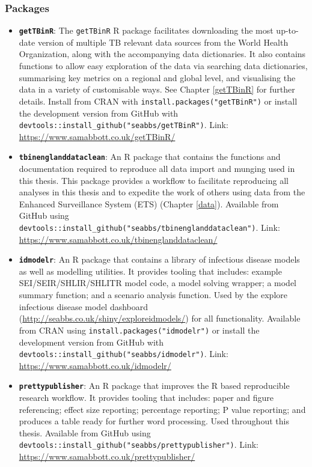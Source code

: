 \documentclass[11pt,twoside]{bristolthesis}
\begin{document}
  \hypertarget{packages}{%
  \subsubsection{Packages}\label{packages}}
  \begin{itemize}
  \item
    \textbf{\texttt{getTBinR}}: The \texttt{getTBinR} R package facilitates downloading the most up-to-date version of multiple TB relevant data sources from the World Health Organization, along with the accompanying data dictionaries. It also contains functions to allow easy exploration of the data via searching data dictionaries, summarising key metrics on a regional and global level, and visualising the data in a variety of customisable ways. See Chapter \ref{getTBinR} for further details. Install from CRAN with \texttt{install.packages("getTBinR")} or install the development version from GitHub with \texttt{devtools::install\_github("seabbs/getTBinR")}. Link: \url{https://www.samabbott.co.uk/getTBinR/}
  \item
    \textbf{\texttt{tbinenglanddataclean}}: An R package that contains the functions and documentation required to reproduce all data import and munging used in this thesis. This package provides a workflow to facilitate reproducing all analyses in this thesis and to expedite the work of others using data from the Enhanced Surveillance System (ETS) (Chapter \ref{data}). Available from GitHub using \texttt{devtools::install\_github("seabbs/tbinenglanddataclean")}. Link: \url{https://www.samabbott.co.uk/tbinenglanddataclean/}
  \item
    \textbf{\texttt{idmodelr}}: An R package that contains a library of infectious disease models as well as modelling utilities. It provides tooling that includes: example SEI/SEIR/SHLIR/SHLITR model code, a model solving wrapper; a model summary function; and a scenario analysis function. Used by the explore infectious disease model dashboard (\url{http://seabbs.co.uk/shiny/exploreidmodels/}) for all functionality. Available from CRAN using \texttt{install.packages("idmodelr")} or install the development version from GitHub with \texttt{devtools::install\_github("seabbs/idmodelr")}. Link: \url{https://www.samabbott.co.uk/idmodelr/}
  \item
    \textbf{\texttt{prettypublisher}}: An R package that improves the R based reproducible research workflow. It provides tooling that includes: paper and figure referencing; effect size reporting; percentage reporting; P value reporting; and produces a table ready for further word processing. Used throughout this thesis. Available from GitHub using \texttt{devtools::install\_github("seabbs/prettypublisher")}. Link: \url{https://www.samabbott.co.uk/prettypublisher/}
  \end{itemize}
\end{document}
